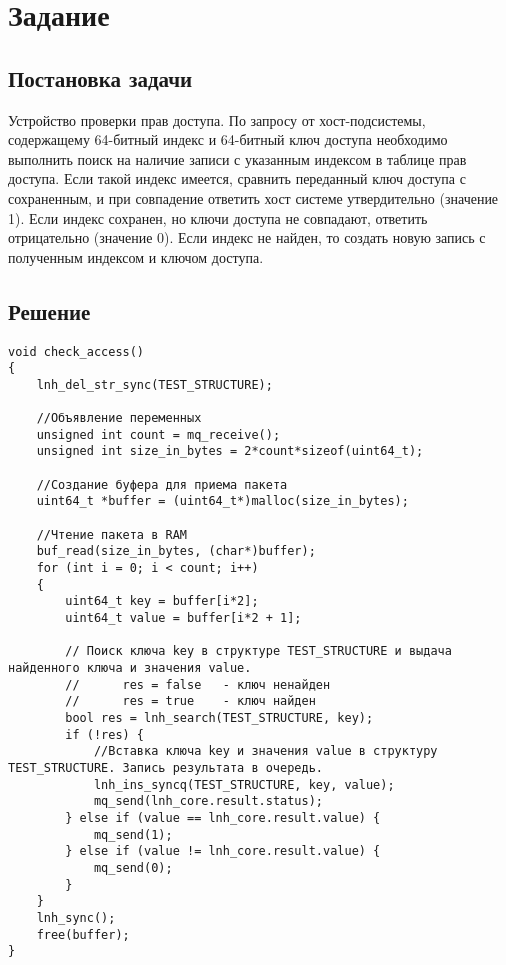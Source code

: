 \section{Задание}

\subsection{Постановка задачи}
Устройство проверки прав доступа. По запросу от хост-подсистемы, содержащему 64-битный индекс и 64-битный ключ доступа необходимо выполнить поиск на наличие записи с указанным индексом в таблице прав доступа. 
Если такой индекс имеется, сравнить переданный ключ доступа с сохраненным, и при совпадение ответить хост системе утвердительно (значение 1). 
Если индекс сохранен, но ключи доступа не совпадают, ответить отрицательно (значение 0). 
Если индекс не найден, то создать новую запись с полученным индексом и ключом доступа.

\subsection{Решение}
\captionsetup{singlelinecheck = false, justification=raggedright}
\begin{lstlisting}[style={c++},label={lst:lst2}, caption={Проверка прав доступа}]
    void check_access() 
{
    lnh_del_str_sync(TEST_STRUCTURE);
    
    //Объявление переменных
    unsigned int count = mq_receive();
    unsigned int size_in_bytes = 2*count*sizeof(uint64_t);
    
    //Создание буфера для приема пакета
    uint64_t *buffer = (uint64_t*)malloc(size_in_bytes);
    
    //Чтение пакета в RAM
    buf_read(size_in_bytes, (char*)buffer);
    for (int i = 0; i < count; i++)
    {
        uint64_t key = buffer[i*2];
        uint64_t value = buffer[i*2 + 1];
        
        // Поиск ключа key в структуре TEST_STRUCTURE и выдача найденного ключа и значения value.
        //      res = false   - ключ ненайден
        //      res = true    - ключ найден
        bool res = lnh_search(TEST_STRUCTURE, key);
        if (!res) {
            //Вставка ключа key и значения value в структуру TEST_STRUCTURE. Запись результата в очередь.
            lnh_ins_syncq(TEST_STRUCTURE, key, value);
            mq_send(lnh_core.result.status);
        } else if (value == lnh_core.result.value) {
            mq_send(1);
        } else if (value != lnh_core.result.value) {
            mq_send(0);
        }
    }
    lnh_sync();
    free(buffer);
}

\end{lstlisting}

